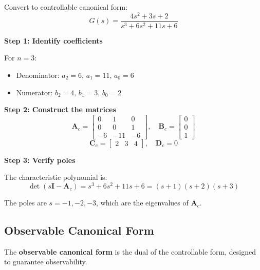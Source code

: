 \begin{example}
\label{ex:tf_to_ccf_3rd}
Convert to controllable canonical form:
\begin{equation}
G(s) = \frac{4s^2 + 3s + 2}{s^3 + 6s^2 + 11s + 6}
\end{equation}

\textbf{Step 1: Identify coefficients}

For $n = 3$:
\begin{itemize}
    \item Denominator: $a_2 = 6, \, a_1 = 11, \, a_0 = 6$
    \item Numerator: $b_2 = 4, \, b_1 = 3, \, b_0 = 2$
\end{itemize}

\textbf{Step 2: Construct the matrices}
\begin{equation}
\mathbf{A}_c = \begin{bmatrix} 0 & 1 & 0 \\ 0 & 0 & 1 \\ -6 & -11 & -6 \end{bmatrix}, \quad
\mathbf{B}_c = \begin{bmatrix} 0 \\ 0 \\ 1 \end{bmatrix}
\end{equation}
\begin{equation}
\mathbf{C}_c = \begin{bmatrix} 2 & 3 & 4 \end{bmatrix}, \quad \mathbf{D}_c = 0
\end{equation}

\textbf{Step 3: Verify poles}

The characteristic polynomial is:
\begin{equation}
\det(s\mathbf{I} - \mathbf{A}_c) = s^3 + 6s^2 + 11s + 6 = (s+1)(s+2)(s+3)
\end{equation}

The poles are $s = -1, -2, -3$, which are the eigenvalues of $\mathbf{A}_c$.
\end{example}

\subsection{Observable Canonical Form}

The \textbf{observable canonical form} is the dual of the controllable form, designed to guarantee observability.

